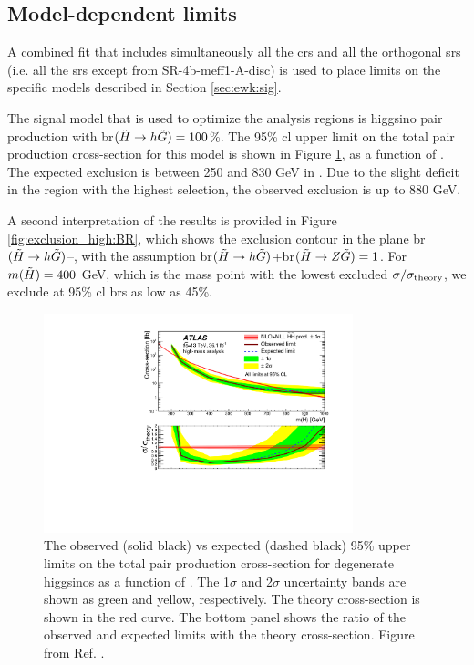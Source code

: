 \subsection{Model-dependent limits}
\label{sec:ewk:modeldep}

A combined fit that includes simultaneously all the \glspl{cr} and all the orthogonal \glspl{sr} (i.e. all the \glspl{sr}
except from  SR-4b-meff1-A-disc) is used to place limits on the specific models described in Section \ref{sec:ewk:sig}.

The signal model that is used to optimize the analysis regions is higgsino pair production with \gls{br}$(\tilde{H}\rightarrow h \tilde{G})=100$\%.
The 95\% \gls{cl} upper limit on the total pair production cross-section for this model is shown in Figure \ref{fig:exclusion_high}, 
as a function of \mhino. 
The expected exclusion is between 250 and 830 GeV in \mhino. 
Due to the slight deficit in the region with the highest \meffb selection, the observed exclusion is up to 880 GeV.

A second interpretation of the results is provided in Figure \ref{fig:exclusion_high:BR}, which shows the exclusion contour in the 
plane \gls{br}$(\tilde{H}\rightarrow h \tilde{G})$--\mhino, with the assumption \gls{br}$(\tilde{H}\rightarrow h \tilde{G})$+\gls{br}$(\tilde{H}\rightarrow Z \tilde{G}) =1$.
For $m(\tilde{H}) = 400$ GeV, which is the mass point with the lowest excluded $\sigma/\sigma_{\rm theory}$, we exclude at 95\% \gls{cl}
\glspl{br} as low as 45\%.


\begin{figure}[htbp]
	\centering
	\includegraphics[width=0.8\textwidth]{figures/ewk_prod/interpretation/limit_HM}
	\caption{The observed (solid black) vs expected (dashed black) 95\% upper limits on the total pair production cross-section for degenerate higgsinos as a function of \mhino. The 1$\sigma$ and 2$\sigma$ uncertainty bands are shown as green and yellow, respectively. The theory cross-section is shown in the red curve. The bottom panel shows the ratio of the observed and expected limits with the theory cross-section. Figure from Ref. \cite{Aaboud:2018htj}.} 
	\label{fig:exclusion_high}
\end{figure}

